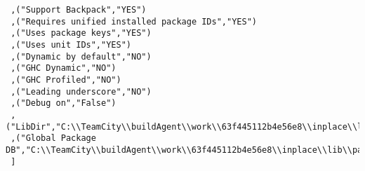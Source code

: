 \begin{verbatim}
 ,("Support Backpack","YES")
 ,("Requires unified installed package IDs","YES")
 ,("Uses package keys","YES")
 ,("Uses unit IDs","YES")
 ,("Dynamic by default","NO")
 ,("GHC Dynamic","NO")
 ,("GHC Profiled","NO")
 ,("Leading underscore","NO")
 ,("Debug on","False")
 ,("LibDir","C:\\TeamCity\\buildAgent\\work\\63f445112b4e56e8\\inplace\\lib")
 ,("Global Package DB","C:\\TeamCity\\buildAgent\\work\\63f445112b4e56e8\\inplace\\lib\\package.conf.d")
 ]
\end{verbatim}
